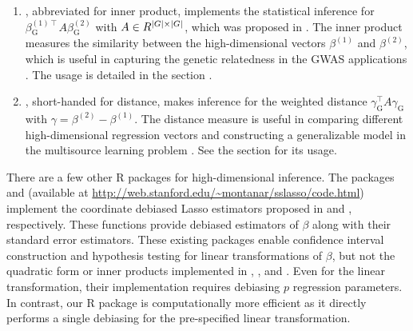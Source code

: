 \begin{enumerate}
    \item {}, abbreviated for inner product, implements the statistical inference for $\beta^{(1)\intercal}_\mathrm{G} A \beta^{(2)}_\mathrm{G}$ with $A\in R^{|G|\times |G|}$, which was proposed in \cite{guo2019optimal, ma2022statistical}. The inner product measures the similarity between the high-dimensional vectors $\beta^{(1)}$ and $\beta^{(2)}$, which is useful in capturing the genetic relatedness in the GWAS applications \citep{guo2019optimal, ma2022statistical}. %
    The usage is detailed in the section .%
 
    \item {}, short-handed for distance, makes inference for the weighted distance $\gamma_\mathrm{G}^\intercal A \gamma_\mathrm{G}$ with $\gamma = \beta^{(2)} - \beta^{(1)}$. The distance measure is useful in comparing different high-dimensional regression vectors and constructing a generalizable model in the multisource learning problem \citet{guo2023robust}. See the section  for its usage. %
\end{enumerate}

There are a few other R packages for high-dimensional inference. The packages  and  (available at \url{http://web.stanford.edu/~montanar/sslasso/code.html}) implement the coordinate debiased Lasso estimators proposed in \citet{van2014asymptotically} and \citet{javanmard2014confidence}, respectively. These functions provide debiased estimators of $\beta$ along with their standard error estimators. These existing packages enable confidence interval construction and hypothesis testing for linear transformations of $\beta$, but not the quadratic form or inner products implemented in , , and . Even for the linear transformation, their implementation requires debiasing $p$ regression parameters. In contrast, our R package  is computationally more efficient as it directly performs a single debiasing for the pre-specified linear transformation.

